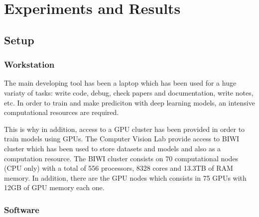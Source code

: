
\chapter{Experiments and Results}
\label{cha:experimentsandresults}




\section{Setup}
\subsection{Workstation}

The main developing tool has been a laptop which has been used for a huge variaty of tasks: write code, debug, check papers and documentation, write notes, etc.
In order to train and make prediciton with deep learning models, an intensive computational resources are required.

This is why in addition, access to a GPU cluster has been provided in order to train models using GPUs.
The Computer Vision Lab provide access to BIWI cluster which has been used to store datasets and models and also as a computation resource. The BIWI cluster consists on 70 computational nodes (CPU only) with a total of 556 processors, 8328 cores and 13.3TB of RAM memory.
In addition, there are the GPU nodes which consists in 75 GPUs with 12GB of GPU memory each one.

\subsection{Software}

